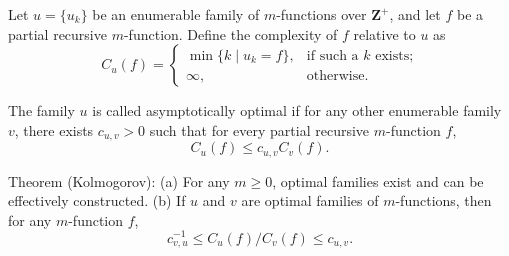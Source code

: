 Let $u = \{u_k\}$ be an enumerable family of $m$-functions over $\mathbf{Z}^+$, and let $f$ be a partial recursive $m$-function. Define the complexity of $f$ relative to $u$ as
$$C_u(f) = \begin{cases} \min\{k \mid u_k = f\}, & \text{if such a } k \text{ exists;} \\ \infty, & \text{otherwise.} \end{cases}$$

The family $u$ is called asymptotically optimal if for any other enumerable family $v$, there exists $c_{u,v} > 0$ such that for every partial recursive $m$-function $f$,
$$C_u(f) \leqslant c_{u,v}C_v(f).$$

Theorem (Kolmogorov):
(a) For any $m \geq 0$, optimal families exist and can be effectively constructed.
(b) If $u$ and $v$ are optimal families of $m$-functions, then for any $m$-function $f$,
$$c_{v,u}^{-1} \leqslant C_u(f)/C_v(f) \leqslant c_{u,v}.$$
